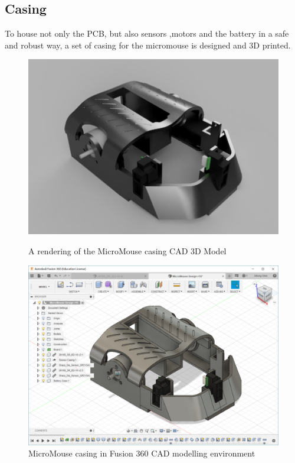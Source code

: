 \FloatBarrier
\vspace{1cm}

\subsection{Casing}

To house not only the PCB, but also sensors ,motors and the battery in a safe and robust way, a set of casing for the micromouse is designed and 3D printed.

\begin{figure}[htb]
    \centering
    \begin{minipage}{.45\textwidth}
          \centering
            \includegraphics[width=.9\linewidth]{figures/Casing/CADrendering.png}
              \caption{A rendering of the MicroMouse casing CAD 3D Model}
    \end{minipage}
    \begin{minipage}{.45\textwidth}
          \centering
            \includegraphics[width=.9\linewidth]{figures/Casing/FusionModelling.PNG}
              \caption{MicroMouse casing in Fusion 360 CAD modelling environment}
                \label{fig:CaseModelling}
    \end{minipage}
\end{figure}

